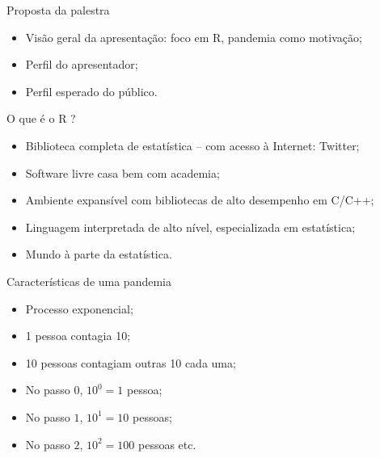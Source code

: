 \documentclass[a4paper,10pt]{beamer}
\begin{document}
\lstset{language=R}          %

\begin{frame}{Proposta da palestra}
  \begin{itemize}
      \item Visão geral da apresentação: foco em R, pandemia como motivação;
      \item Perfil do apresentador;
      \item Perfil esperado do público.
  \end{itemize}

\end{frame}

\begin{frame}{O que é o R ?}
  \begin{itemize}
      \item Biblioteca completa de estatística -- com acesso à 
	  Internet: Twitter;
      \item Software livre casa bem com academia;
      \item Ambiente expansível com bibliotecas de alto desempenho em C/C++;
      \item Linguagem interpretada de alto nível, especializada em estatística;
      \item Mundo à parte da estatística.
  \end{itemize}

\end{frame}

\begin{frame}{Características de uma pandemia}
  \begin{itemize}
      \item Processo exponencial;
      \item 1 pessoa contagia 10;
      \item 10 pessoas contagiam outras 10 cada uma;
      \item No passo $0$, $10^0 = 1 $ pessoa;
      \item No passo $1$, $10^1 = 10$ pessoas;
      \item No passo $2$, $10^2 = 100$ pessoas etc.
  \end{itemize}

\end{frame}
\end{document}
